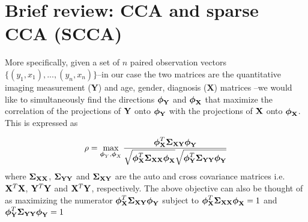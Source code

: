 \documentclass{llncs}
\newcommand{\X}{{\bf X}}
\newcommand{\Y}{{\bf Y}}
\newcommand{\y}{{\bf y}}
\newcommand{\bs}{\boldsymbol}
\begin{document}
\section{Brief review: CCA and sparse CCA (SCCA)}

More specifically, given a set of $n$ paired observation vectors
$\{(y_1,x_1),...,(y_n,x_n)\}$--in our case the two matrices are the
quantitative imaging measurement ({\Y}) and age, gender, diagnosis ({\X}) matrices --we would like to simultaneously find the directions
${\bs{\bs\phi_{\Y}}}$ and
${\bs{\bs\phi_{\X}}}$ that maximize the correlation of
the projections of ${\Y}$ onto ${\bs{\bs\phi_{\Y}}}$
with the projections of ${\X}$ onto
${\bs{\bs\phi_{\X}}}$. This is expressed as

\begin{equation}
\label{cca1}
\rho=\max_{{\bs\phi_Y}, {\bs\phi_X}}
\frac{{\bs\phi_{\X}^T\bs\Sigma_{\X\Y}}\bs\phi_{\Y}}{\sqrt{\bs\phi_{\X}^T\bs\Sigma_{\X\X}\bs\phi_{\X}}\sqrt{\bs\phi_{\Y}^T\bs\Sigma_{\Y\Y}\bs\phi_{\Y}}}
\end{equation}
where ${\bs\Sigma_{\X\X}}$, ${\bs\Sigma_{\Y\Y}}$ and ${\bs\Sigma_{\X\Y}}$ are the auto and cross covariance matrices i.e. $\X^T\X$, $\Y^T\Y$ and $\X^T\Y$, respectively. The above objective can also be thought of as maximizing the numerator $\bs\phi_{\X}^T\bs\Sigma_{\X\Y}\bs\phi_{\Y}$ subject to $\bs\phi_{\X}^T\bs\Sigma_{\X\X}\bs\phi_{\X} =1$ and $\bs\phi_{\Y}^T\bs\Sigma_{\Y\Y}\bs\phi_{\Y}=1$
\end{document}
